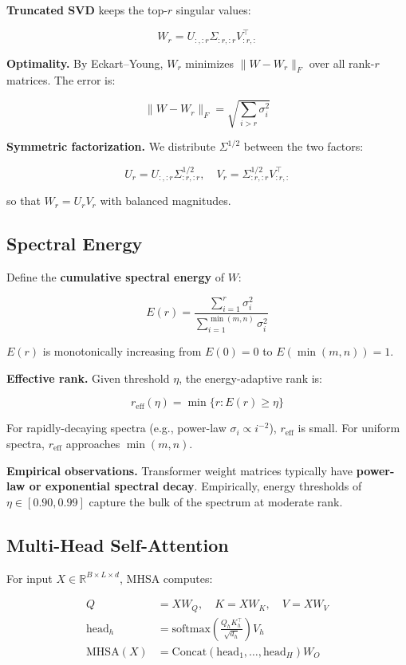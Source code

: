 \textbf{Truncated SVD} keeps the top-$r$ singular values:

\[
W_r = U_{:, :r} \Sigma_{:r, :r} V_{:r, :}^\top
\tag{3.2}
\]

\textbf{Optimality.} By Eckart--Young, $W_r$ minimizes $\|W - W_r\|_F$ over all 
rank-$r$ matrices. The error is:

\[
\|W - W_r\|_F = \sqrt{\sum_{i > r} \sigma_i^2}
\tag{3.3}
\]

\textbf{Symmetric factorization.} We distribute $\Sigma^{1/2}$ between the two 
factors:

\[
U_r = U_{:, :r} \Sigma_{:r, :r}^{1/2}, \quad
V_r = \Sigma_{:r, :r}^{1/2} V_{:r, :}^\top
\tag{3.4}
\]

so that $W_r = U_r V_r$ with balanced magnitudes.

\subsection{Spectral Energy}

Define the \textbf{cumulative spectral energy} of $W$:

\[
E(r) = \frac{\sum_{i=1}^{r} \sigma_i^2}{\sum_{i=1}^{\min(m, n)} \sigma_i^2}
\tag{3.5}
\]

$E(r)$ is monotonically increasing from $E(0) = 0$ to $E(\min(m, n)) = 1$.

\textbf{Effective rank.} Given threshold $\eta$, the energy-adaptive rank is:

\[
r_\text{eff}(\eta) = \min\{r : E(r) \geq \eta\}
\tag{3.6}
\]

For rapidly-decaying spectra (e.g., power-law $\sigma_i \propto i^{-2}$), 
$r_\text{eff}$ is small. For uniform spectra, $r_\text{eff}$ approaches 
$\min(m, n)$.

\textbf{Empirical observations.} Transformer weight matrices typically have 
\textbf{power-law or exponential spectral decay}. Empirically, energy thresholds 
of $\eta \in [0.90, 0.99]$ capture the bulk of the spectrum at moderate rank.

\subsection{Multi-Head Self-Attention}

For input $X \in \mathbb{R}^{B \times L \times d}$, MHSA computes:

\[
\begin{aligned}
Q &= X W_Q, \quad K = X W_K, \quad V = X W_V \\
\text{head}_h &= \text{softmax}\!\left(\frac{Q_h K_h^\top}{\sqrt{d_h}}\right) V_h \\
\text{MHSA}(X) &= \text{Concat}(\text{head}_1, \dots, \text{head}_H) W_O
\end{aligned}
\tag{3.7}
\]


